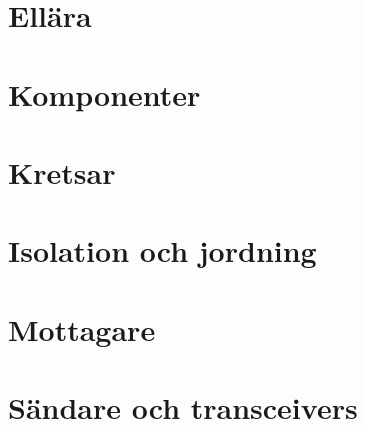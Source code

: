 
\chapter{Ellära}
\label{ellära}











\chapter{Komponenter}
\label{komponenter}











\chapter{Kretsar}











\chapter[Isolation och jord]{Isolation och jordning}


\chapter{Mottagare}










\chapter[Sändare]{Sändare och transceivers}




